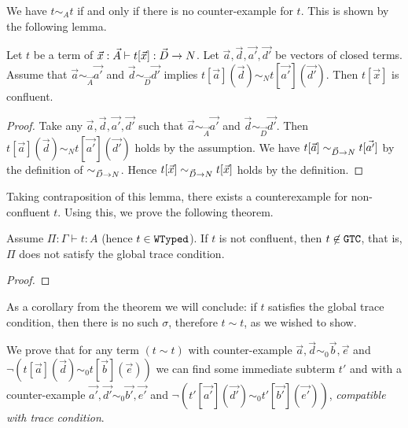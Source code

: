 We have $t \sim_A t$ if and only if there is no counter-example for $t$.
This is shown by the following lemma.
\begin{lemma}
  Let $t$ be a term of $\vec{x}:\vec{A} \vdash t[\vec{x}]:\vec{D}\rightarrow{N}$. 
  Let $\vec{a},\vec{d},\vec{a'},\vec{d'}$ be vectors of closed terms.
  Assume that
  $\vec{a}\sim_{\vec{A}}\vec{a'}$ and $\vec{d}\sim_{\vec{D}}\vec{d'}$ implies $t[\vec{a}](\vec{d}) \sim_N t[\vec{a'}](\vec{d'})$. 
  Then $t[\vec{x}]$ is confluent. 
\end{lemma}
\begin{proof}
  Take any $\vec{a},\vec{d},\vec{a'},\vec{d'}$ such that $\vec{a}\sim_{\vec{A}}\vec{a'}$ and $\vec{d}\sim_{\vec{D}}\vec{d'}$.
  Then $t[\vec{a}](\vec{d}) \sim_N t[\vec{a'}](\vec{d'})$ holds by the assumption.
  We have $t[\vec{a}] \sim_{\vec{D}\rightarrow{N}} t[\vec{a'}]$ by the definition of $\sim_{\vec{D}\rightarrow{N}}$.
  Hence $t[\vec{x}] \sim_{\vec{D}\rightarrow{N}} t[\vec{x}]$ holds by the definition. 
\end{proof}

Taking contraposition of this lemma, there exists a counterexample for non-confluent $t$. 
Using this, we prove the following theorem.

\begin{theorem}
  Assume $\Pi:\Gamma\vdash t:A$ (hence $t \in {\tt WTyped}$). 
  If $t$ is not confluent,
  then $t \not\in {\tt GTC}$, that is, $\Pi$ does not satisfy the global trace condition. 
\end{theorem}
\begin{proof}

\end{proof}

As a corollary from the theorem we will conclude: 
if $t$ satisfies the global trace condition, then there is no such $\sigma$, therefore $t \sim t$, 
as we wished to show.

We prove that for any term $ (t \sim t)$ with counter-example $\vec{a},\vec{d} \sim_0 \vec{b},\vec{e}$
and $\neg (t[\vec{a}](\vec{d}) \sim_0  t[\vec{b}](\vec{e}))$ we can find some immediate
subterm $t'$ and with a counter-example $\vec{a'},\vec{d'} \sim_0 \vec{b'},\vec{e'}$
and $\neg (t'[\vec{a'}](\vec{d'}) \sim_0  t'[\vec{b'}](\vec{e'}))$, \emph{compatible with trace
condition}.


